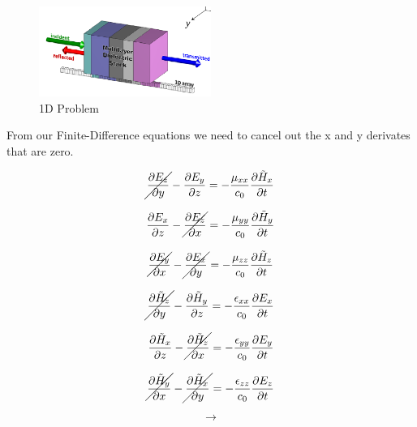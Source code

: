 \documentclass[a4paper,10pt]{article}
\begin{document}
\begin{figure}[h]
  \centering
    \includegraphics[width=0.5\textwidth]{Slabs1D.png}
  \caption{1D Problem}
\end{figure}


From our Finite-Difference equations we need to cancel out the x and y derivates that are zero.


\begin{equation*}
  \cancel{\frac{\partial E_z}{\partial y}} - \frac{\partial E_y}{\partial z} = -\frac{\mu_{xx}}{c_0}\frac{\partial\tilde{H}_x}{\partial t}
\end{equation*}

\begin{equation*}
  \frac{\partial E_x}{\partial z} - \cancel{\frac{\partial E_z}{\partial x}} = -\frac{\mu_{yy}}{c_0}\frac{\partial\tilde{H}_y}{\partial t}
\end{equation*}

\begin{equation*}
  \cancel{\frac{\partial E_y}{\partial x}} - \cancel{\frac{\partial E_x}{\partial y}} = -\frac{\mu_{zz}}{c_0}\frac{\partial\tilde{H}_z}{\partial t}
\end{equation*}

\begin{equation*}
  \cancel{\frac{\partial \tilde{H}_z}{\partial y}} - \frac{\partial \tilde{H}_y}{\partial z} = -\frac{\epsilon_{xx}}{c_0}\frac{\partial E_x}{\partial t}
\end{equation*}

\begin{equation*}
  \frac{\partial \tilde{H}_x}{\partial z} - \cancel{\frac{\partial \tilde{H}_z}{\partial x}} = -\frac{\epsilon_{yy}}{c_0}\frac{\partial E_y}{\partial t}
\end{equation*}

\begin{equation*}
  \cancel{\frac{\partial \tilde{H}_y}{\partial x}} - \cancel{\frac{\partial \tilde{H}_x}{\partial y}} = -\frac{\epsilon_{zz}}{c_0}\frac{\partial E_z}{\partial t}
\end{equation*}

\[\longrightarrow\]
\end{document}
